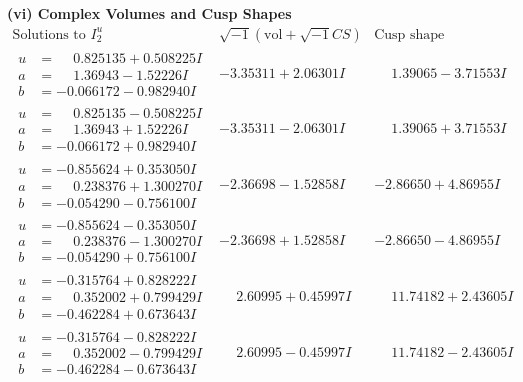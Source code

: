 \documentclass[1p]{elsarticle_modified}
\theoremstyle{definition}
\newcommand{\I}{\sqrt{-1}}
\begin{document}
\newpage\flushleft \textbf{(vi) Complex Volumes and Cusp Shapes}
$$\begin{array}{c|c|c}  
\text{Solutions to }I^u_{2}& \I (\text{vol} + \sqrt{-1}CS) & \text{Cusp shape}\\
 \hline 
\begin{aligned}
u &= \phantom{-}0.825135 + 0.508225 I \\
a &= \phantom{-}1.36943 - 1.52226 I \\
b &= -0.066172 - 0.982940 I\end{aligned}
 & -3.35311 + 2.06301 I & \phantom{-}1.39065 - 3.71553 I \\ \hline\begin{aligned}
u &= \phantom{-}0.825135 - 0.508225 I \\
a &= \phantom{-}1.36943 + 1.52226 I \\
b &= -0.066172 + 0.982940 I\end{aligned}
 & -3.35311 - 2.06301 I & \phantom{-}1.39065 + 3.71553 I \\ \hline\begin{aligned}
u &= -0.855624 + 0.353050 I \\
a &= \phantom{-}0.238376 + 1.300270 I \\
b &= -0.054290 - 0.756100 I\end{aligned}
 & -2.36698 - 1.52858 I & -2.86650 + 4.86955 I \\ \hline\begin{aligned}
u &= -0.855624 - 0.353050 I \\
a &= \phantom{-}0.238376 - 1.300270 I \\
b &= -0.054290 + 0.756100 I\end{aligned}
 & -2.36698 + 1.52858 I & -2.86650 - 4.86955 I \\ \hline\begin{aligned}
u &= -0.315764 + 0.828222 I \\
a &= \phantom{-}0.352002 + 0.799429 I \\
b &= -0.462284 + 0.673643 I\end{aligned}
 & \phantom{-}2.60995 + 0.45997 I & \phantom{-}11.74182 + 2.43605 I \\ \hline\begin{aligned}
u &= -0.315764 - 0.828222 I \\
a &= \phantom{-}0.352002 - 0.799429 I \\
b &= -0.462284 - 0.673643 I\end{aligned}
 & \phantom{-}2.60995 - 0.45997 I & \phantom{-}11.74182 - 2.43605 I \\ \hline\begin{aligned}

\end{aligned}
\end{array}$$
\end{document}
